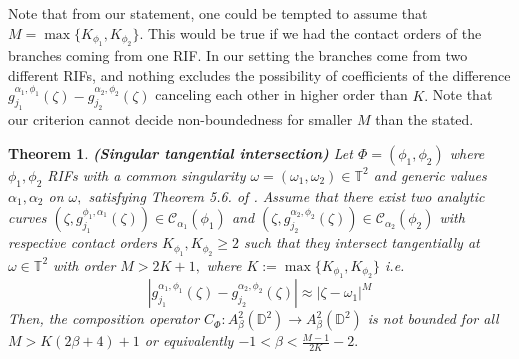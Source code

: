 \documentclass[12pt]{amsart}
\newtheorem{theorem}{Theorem}[section]
\numberwithin{equation}{section}
\begin{document}
Note that from our statement, one could be tempted to assume that $M=\max\{K_{\phi_1},K_{\phi_2}\}.$ This would be true if we had the contact orders of the branches coming from one RIF. In our setting the branches come from two different RIFs, and nothing excludes the possibility of coefficients of the difference $g^{\alpha_1,\phi_1}_{j_1}(\zeta)-g_{j_2}^{\alpha_2,\phi_2}(\zeta)$ canceling each other in higher order than $K.$ Note that our criterion cannot decide non-boundedness for smaller $M$ than the stated.
\begin{theorem}\textbf{(Singular tangential intersection)} Let $\Phi=(\phi_1,\phi_2)$ where $\phi_1,\phi_2$ RIFs with a common singularity $\omega=(\omega_1,\omega_2)\in\mathbb{T}^2$ and generic values $\alpha_1,\alpha_2$ on $\omega,$ satisfying Theorem 5.6. of \cite{Clark}. Assume that there exist two analytic curves $(\zeta,g_{j_1}^{\phi_1,\alpha_1}(\zeta))\in\mathcal{C}_{{\alpha}_1}(\phi_1)$ and $(\zeta,g^{\alpha_2,\phi_2}_{j_2}(\zeta))\in\mathcal{C}_{\alpha_2}(\phi_2)$ with respective contact orders $K_{\phi_1}, K_{\phi_2}\ge 2$ such that they intersect tangentially at $\omega\in\mathbb{T}^2$ with order $M>2K+1,$ where $K:=\max\{K_{\phi_1},K_{\phi_2}\}$ i.e.
$$|g^{\alpha_1,\phi_1}_{j_1}(\zeta)-g_{j_2}^{\alpha_2,\phi_2}(\zeta)|\approx |\zeta-\omega_1|^M$$
Then, the composition operator $C_{\Phi}:A^2_{\beta}(\mathbb{D}^2)\to A^2_{\beta}(\mathbb{D}^2)$ is not bounded for all $M>K(2\beta+4)+1$ or equivalently $-1<\beta<\frac{M-1}{2K}-2.$  
\end{theorem}
\end{document}
